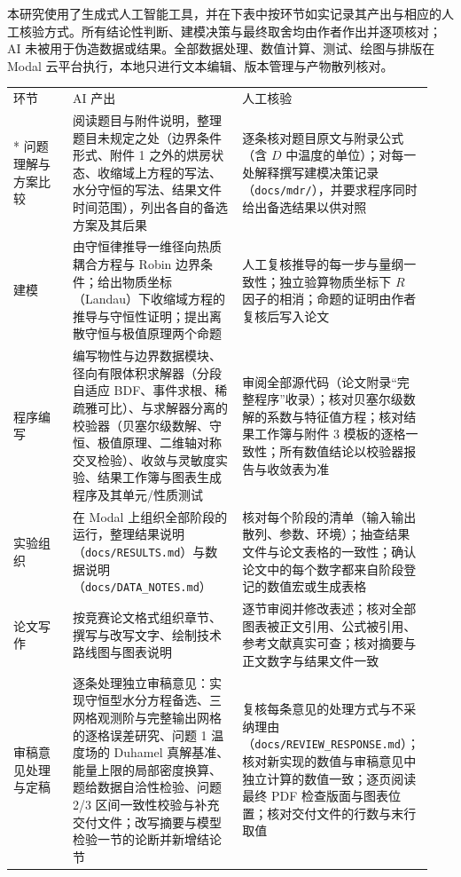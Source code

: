 本研究使用了生成式人工智能工具，并在下表中按环节如实记录其产出与相应的人工核验方式。所有结论性判断、建模决策与最终取舍均由作者作出并逐项核对；AI 未被用于伪造数据或结果。全部数据处理、数值计算、测试、绘图与排版在 Modal 云平台执行，本地只进行文本编辑、版本管理与产物散列核对。

\begin{longtable}{@{}p{0.14\linewidth}p{0.40\linewidth}p{0.40\linewidth}@{}}
\toprule 环节 & AI 产出 & 人工核验 \\* \midrule \endhead \bottomrule \endfoot
问题理解与\newline 方案比较 &
阅读题目与附件说明，整理题目未规定之处（边界条件形式、附件 1 之外的烘房状态、收缩域上方程的写法、水分守恒的写法、结果文件时间范围），列出各自的备选方案及其后果 &
逐条核对题目原文与附录公式（含 $D$ 中温度的单位）；对每一处解释撰写建模决策记录（\nolinkurl{docs/mdr/}），并要求程序同时给出备选结果以供对照 \\
建模 &
由守恒律推导一维径向热质耦合方程与 Robin 边界条件；给出物质坐标（Landau）下收缩域方程的推导与守恒性证明；提出离散守恒与极值原理两个命题 &
人工复核推导的每一步与量纲一致性；独立验算物质坐标下 $R$ 因子的相消；命题的证明由作者复核后写入论文 \\
程序编写 &
编写物性与边界数据模块、径向有限体积求解器（分段自适应 BDF、事件求根、稀疏雅可比）、与求解器分离的校验器（贝塞尔级数解、守恒、极值原理、二维轴对称交叉检验）、收敛与灵敏度实验、结果工作簿与图表生成程序及其单元/性质测试 &
审阅全部源代码（论文附录“完整程序”收录）；核对贝塞尔级数解的系数与特征值方程；核对结果工作簿与附件 3 模板的逐格一致性；所有数值结论以校验器报告与收敛表为准 \\
实验组织 &
在 Modal 上组织全部阶段的运行，整理结果说明（\nolinkurl{docs/RESULTS.md}）与数据说明（\nolinkurl{docs/DATA_NOTES.md}） &
核对每个阶段的清单（输入输出散列、参数、环境）；抽查结果文件与论文表格的一致性；确认论文中的每个数字都来自阶段登记的数值宏或生成表格 \\
论文写作 &
按竞赛论文格式组织章节、撰写与改写文字、绘制技术路线图与图表说明 &
逐节审阅并修改表述；核对全部图表被正文引用、公式被引用、参考文献真实可查；核对摘要与正文数字与结果文件一致 \\
审稿意见\newline 处理与定稿 &
逐条处理独立审稿意见：实现守恒型水分方程备选、三网格观测阶与完整输出网格的逐格误差研究、问题 1 温度场的 Duhamel 真解基准、能量上限的局部密度换算、题给数据自洽性检验、问题 2/3 区间一致性校验与补充交付文件；改写摘要与模型检验一节的论断并新增结论节 &
复核每条意见的处理方式与不采纳理由（\nolinkurl{docs/REVIEW_RESPONSE.md}）；核对新实现的数值与审稿意见中独立计算的数值一致；逐页阅读最终 PDF 检查版面与图表位置；核对交付文件的行数与末行取值 \\
\end{longtable}

